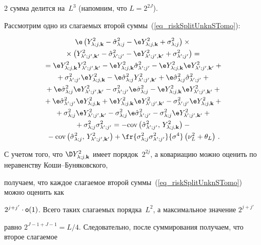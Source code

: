 \begin{multicols}{2}
сумма делится на~$L^3$ (напомним, что $L=2^{2J}$).





Рассмотрим одно из слагаемых второй суммы~(\ref{eq_riskSplitUnknSTomo}):


\begin{multline*}


\e\left( \Yljk^2 - \hslj - \e\Yljk^2 + \slj \right) \times{}\\


{}\times\left( \Yljks^2 - \hsljs - \e\Yljks^2 + \sljs \right) = {}\\


{}= \e\Yljk^2\Yljks^2 - \e\Yljk^2\hsljs - \e\Yljk^2 \e\Yljks^2 +{}\\


{}+ \sljs \e\Yljk^2 - 


 \e\hslj\Yljks^2 + \e\hslj\hsljs +{}\\


 {}+ \e\hslj\e\Yljks^2 - \sljs\e\hslj 


- \e\Yljk^2 \e\Yljks^2 +{}\\


{}+ \e\hsljs\e\Yljk^2 + \e\Yljk^2 \e\Yljks^2 - \sljs\e\Yljk^2 


+ {}\\


{}+\slj\e\Yljks^2 - \slj\e\hsljs - \slj\e\Yljks^2 +{}\\


{}+ \slj\sljs = 


 - \cov\left( \hsljs,\,\Yljk^2 \right) -{}\\


 {}- \cov\left( \hslj,\,\Yljks^2 \right) +


 \fr{\slj\sljs}{\sigma^4}\left( \nu_L^2 + \theta_L \right)\,.


\end{multline*}


С учетом того, что $\D\Yljk^2$ имеет порядок~$2^{2j}$, а ковариацию можно оценить по неравенству Коши--Бу\-ня\-ков\-ско\-го, 


получаем, что каждое слагаемое второй суммы~(\ref{eq_riskSplitUnknSTomo}) можно оценить как 


$2^{j+j'}\cdot\textsf{o}(1)$. Всего таких слагаемых порядка~$L^2$, а максимальное значение $2^{j+j'}$ 


равно $2^{J-1+J-1}=L/4$. Следовательно, после суммирования получаем, что второе сла\-га\-емое 



\end{multicols}
